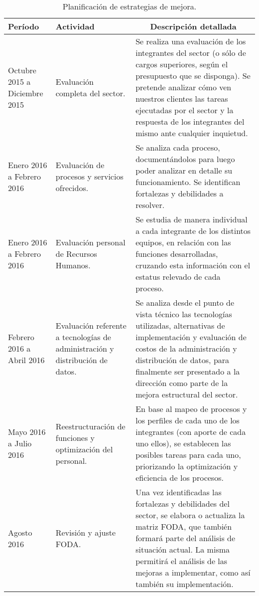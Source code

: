 \begin{center}
\begin{longtable}{|>{\centering\arraybackslash}m{3cm}|>{\centering\arraybackslash}m{3cm}|m{7cm}|}
\caption{Planificación de estrategias de mejora.}
\\

\hline
\textbf{Período}
&
\textbf{Actividad}
&
\multicolumn{1}{c|}{\textbf{Descripción detallada}}
\\
\hline
\endhead
\label{estrategias}
Octubre 2015 a Diciembre 2015
&
Evaluación completa del sector.
&
Se realiza una evaluación de los integrantes del sector (o sólo de cargos superiores, según el presupuesto que se disponga).
Se pretende analizar cómo ven nuestros clientes las tareas ejecutadas por el sector y la respuesta de los integrantes del mismo ante cualquier inquietud.
\\
\hline
Enero 2016 a Febrero 2016
&
Evaluación de procesos y servicios ofrecidos.
&
Se analiza cada proceso, documentándolos para luego poder analizar en detalle su funcionamiento. Se identifican fortalezas y debilidades a resolver.
\\
\hline
Enero 2016 a Febrero 2016
&
Evaluación personal de Recursos Humanos.
&
Se estudia de manera individual a cada integrante de los distintos equipos, en relación con las funciones desarrolladas, cruzando esta información con el estatus relevado de cada proceso.
\\
\hline
Febrero 2016 a Abril 2016
&
Evaluación referente a tecnologías de administración y distribución de datos.
&
Se analiza desde el punto de vista técnico las tecnologías utilizadas, alternativas de implementación y evaluación de costos de la administración y distribución de datos, para finalmente ser presentado a la dirección como parte de la mejora estructural del sector.
\\
\hline
Mayo 2016 a Julio 2016
&
Reestructuración de funciones y optimización del personal.
&
En base al mapeo de procesos y los perfiles de cada uno de los integrantes (con aporte de cada uno ellos), se establecen las posibles tareas para cada uno, priorizando la optimización y eficiencia de los procesos.
\\
\hline
Agosto 2016
&
Revisión y ajuste FODA.
&
Una vez identificadas las fortalezas y debilidades del sector, se  elabora o actualiza la matriz FODA, que también formará parte del análisis de situación actual. La misma permitirá el análisis de las mejoras a implementar, como así también su implementación.
\\

\end{longtable}
\end{center}
